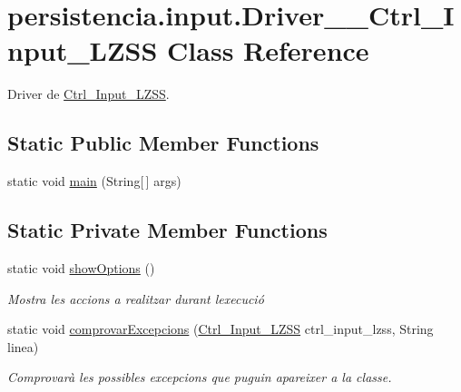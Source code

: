 \hypertarget{classpersistencia_1_1input_1_1Driver____Ctrl__Input__LZSS}{}\section{persistencia.\+input.\+Driver\+\_\+\+\_\+\+Ctrl\+\_\+\+Input\+\_\+\+L\+Z\+SS Class Reference}
\label{classpersistencia_1_1input_1_1Driver____Ctrl__Input__LZSS}


Driver de \hyperlink{classpersistencia_1_1input_1_1Ctrl__Input__LZSS}{Ctrl\+\_\+\+Input\+\_\+\+L\+Z\+SS}.  


\subsection*{Static Public Member Functions}
\begin{DoxyCompactItemize}
\item 
static void \hyperlink{classpersistencia_1_1input_1_1Driver____Ctrl__Input__LZSS_a28b3106d1ed28319e5a7066c975da375}{main} (String\mbox{[}$\,$\mbox{]} args)
\end{DoxyCompactItemize}
\subsection*{Static Private Member Functions}
\begin{DoxyCompactItemize}
\item 
static void \hyperlink{classpersistencia_1_1input_1_1Driver____Ctrl__Input__LZSS_a8221302c3603529654a83e02b976c662}{show\+Options} ()
\begin{DoxyCompactList}\small\item\em Mostra les accions a realitzar durant l\textquotesingle{}execució \end{DoxyCompactList}\item 
static void \hyperlink{classpersistencia_1_1input_1_1Driver____Ctrl__Input__LZSS_a221f978664fc97bdab3b18d3c5f55155}{comprovar\+Excepcions} (\hyperlink{classpersistencia_1_1input_1_1Ctrl__Input__LZSS}{Ctrl\+\_\+\+Input\+\_\+\+L\+Z\+SS} ctrl\+\_\+input\+\_\+lzss, String linea)
\begin{DoxyCompactList}\small\item\em Comprovarà les possibles excepcions que puguin apareixer a la classe. \end{DoxyCompactList}\end{DoxyCompactItemize}


